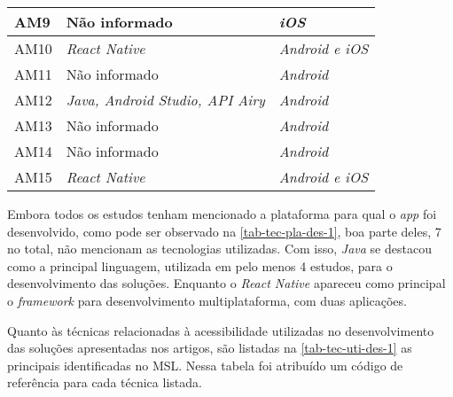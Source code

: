 \begin{table}[htb]
\begin{center}
\begin{tabular}{p{1.0cm}|p{8.0cm}|p{3.0cm}}
            AM9             & Não informado                                                    & \emph{iOS}           \\
            \hline
            AM10            & \emph{React Native}                                              & \emph{Android e iOS} \\
            \hline
            AM11            & Não informado                                                    & \emph{Android}       \\
            \hline
            AM12            & \emph{Java, Android Studio, API Airy}                            & \emph{Android}       \\
            \hline
            AM13            & Não informado                                                    & \emph{Android}       \\
            \hline
            AM14            & Não informado                                                    & \emph{Android}       \\
            \hline
            AM15            & \emph{React Native}                                              & \emph{Android e iOS} \\
        \end{tabular}
    \end{center}
\end{table}

Embora todos os estudos tenham mencionado a plataforma para qual o \emph{app} foi desenvolvido,
como pode ser observado na \autoref{tab-tec-pla-des-1}, boa parte deles, 7 no total, não mencionam as tecnologias utilizadas.
Com isso, \emph{Java} se destacou como a principal linguagem, utilizada em pelo menos 4 estudos, para o desenvolvimento das soluções.
Enquanto o \emph{React Native} apareceu como principal o \emph{framework} para desenvolvimento multiplataforma, com duas aplicações.

\newpage

Quanto às técnicas relacionadas à acessibilidade utilizadas no desenvolvimento das soluções apresentadas nos artigos, são listadas
na \autoref{tab-tec-uti-des-1} as principais identificadas no MSL\@.
Nessa tabela foi atribuído um código de referência para cada técnica listada.


